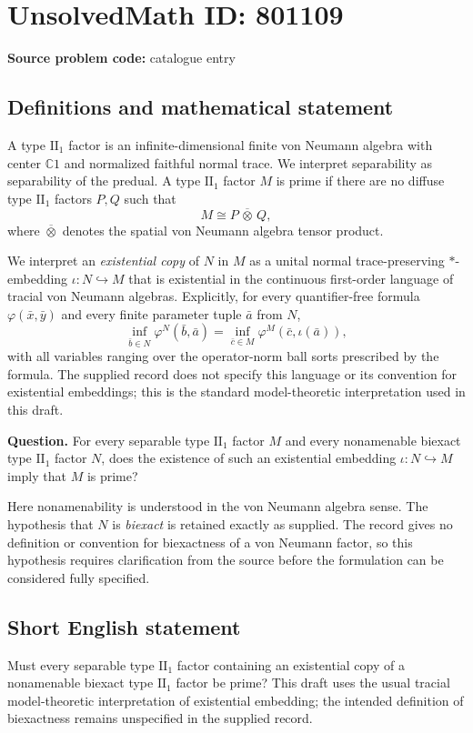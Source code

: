 \documentclass[11pt]{article}
\newcommand{\C}{\mathbb{C}}
\begin{document}
\section*{UnsolvedMath ID: 801109}
\textbf{Source problem code:} catalogue entry
\subsection{Definitions and mathematical statement}
A type $\mathrm{II}_1$ factor is an infinite-dimensional finite von Neumann algebra with center $\C 1$ and normalized faithful normal trace. We interpret separability as separability of the predual. A type $\mathrm{II}_1$ factor $M$ is prime if there are no diffuse type $\mathrm{II}_1$ factors $P,Q$ such that
\[
M\cong P\,\overline\otimes\,Q,
\]
where $\overline\otimes$ denotes the spatial von Neumann algebra tensor product.

We interpret an \emph{existential copy} of $N$ in $M$ as a unital normal trace-preserving $*$-embedding $\iota:N\hookrightarrow M$ that is existential in the continuous first-order language of tracial von Neumann algebras. Explicitly, for every quantifier-free formula $\varphi(\bar x,\bar y)$ and every finite parameter tuple $\bar a$ from $N$,
\[
\inf_{\bar b\in N}\varphi^N(\bar b,\bar a)
=
\inf_{\bar c\in M}\varphi^M(\bar c,\iota(\bar a)),
\]
with all variables ranging over the operator-norm ball sorts prescribed by the formula. The supplied record does not specify this language or its convention for existential embeddings; this is the standard model-theoretic interpretation used in this draft.

\textbf{Question.} For every separable type $\mathrm{II}_1$ factor $M$ and every nonamenable biexact type $\mathrm{II}_1$ factor $N$, does the existence of such an existential embedding $\iota:N\hookrightarrow M$ imply that $M$ is prime?

Here nonamenability is understood in the von Neumann algebra sense. The hypothesis that $N$ is \emph{biexact} is retained exactly as supplied. The record gives no definition or convention for biexactness of a von Neumann factor, so this hypothesis requires clarification from the source before the formulation can be considered fully specified.
\subsection{Short English statement}
Must every separable type $\mathrm{II}_1$ factor containing an existential copy of a nonamenable biexact type $\mathrm{II}_1$ factor be prime? This draft uses the usual tracial model-theoretic interpretation of existential embedding; the intended definition of biexactness remains unspecified in the supplied record.
\end{document}
